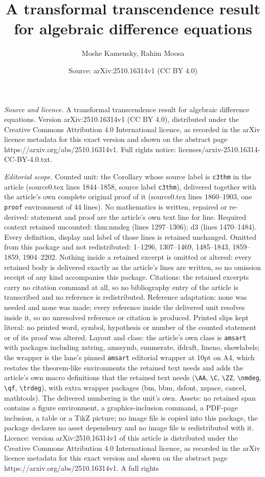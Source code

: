 \documentclass[10pt,a4paper]{amsart}
\title[A transformal transcendence result for algebraic difference ]{A transformal transcendence result for algebraic difference equations}
\author{Moshe Kamensky, Rahim Moosa}
\date{Source: arXiv:2510.16314v1 (CC BY 4.0)}
\begin{document}
\maketitle

\noindent\emph{Source and licence.} A transformal transcendence result for algebraic difference equations. Version arXiv:2510.16314v1 (CC BY 4.0), distributed under the Creative Commons Attribution 4.0 International licence, as recorded in the arXiv licence metadata for this exact version and shown on the abstract page https://arxiv.org/abs/2510.16314v1. Full rights notice: licenses/arxiv-2510.16314-CC-BY-4.0.txt.\par\smallskip

\noindent\textit{Editorial scope.} Counted unit: the Corollary whose source label is \texttt{c3thm} in the article (source0.tex lines 1844--1858, source label \texttt{c3thm}), delivered together with the article's own complete original proof of it (source0.tex lines 1860--1903, one \texttt{proof} environment of 44 lines). No mathematics is written, repaired or re-derived: statement and proof are the article's own text line for line. Required context retained uncounted: thm:nmdeg (lines 1297--1306); d3 (lines 1470--1484). Every definition, display and label of those lines is retained unchanged. Omitted from this package and not redistributed: 1--1296, 1307--1469, 1485--1843, 1859--1859, 1904--2202. Nothing inside a retained excerpt is omitted or altered: every retained body is delivered exactly as the article's lines are written, so no omission receipt of any kind accompanies this package. Citations: the retained excerpts carry no citation command at all, so no bibliography entry of the article is transcribed and no reference is redistributed. Reference adaptation: none was needed and none was made; every reference inside the delivered unit resolves inside it, so no unresolved reference or citation is produced. Printed slips kept literal: no printed word, symbol, hypothesis or number of the counted statement or of its proof was altered. Layout and class: the article's own class is \texttt{amsart} with packages including xstring, amssymb, enumerate, ifdraft, lineno, showlabels; the wrapper is the lane's pinned \texttt{amsart} editorial wrapper at 10pt on A4, which restates the theorem-like environments the retained text needs and adds the article's own macro definitions that the retained text needs (\texttt{\textbackslash AA}, \texttt{\textbackslash C}, \texttt{\textbackslash ZZ}, \texttt{\textbackslash nmdeg}, \texttt{\textbackslash qf}, \texttt{\textbackslash trdeg}), with extra wrapper packages (bm, bbm, dsfont, xspace, cancel, mathtools). The delivered numbering is the unit's own. Assets: no retained span contains a figure environment, a graphics-inclusion command, a PDF-page inclusion, a table or a TikZ picture; no image file is copied into this package, the package declares no asset dependency and no image file is redistributed with it. Licence: version arXiv:2510.16314v1 of this article is distributed under the Creative Commons Attribution 4.0 International licence, as recorded in the arXiv licence metadata for this exact version and shown on the abstract page https://arxiv.org/abs/2510.16314v1. A full rights 
\end{document}
